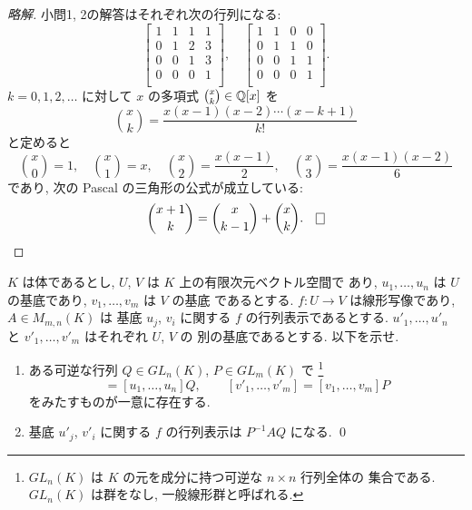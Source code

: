 \documentclass[12pt,twoside]{jarticle}
\newcommand\commentout[1]{#1}
\newcommand\commentout[1]{}
\begin{document}
\commentout{
\begin{proof}[略解]
 小問1, 2の解答はそれぞれ次の行列になる:
 \begin{equation*}
  \begin{bmatrix}
   1 & 1 & 1 & 1 \\
   0 & 1 & 2 & 3 \\
   0 & 0 & 1 & 3 \\
   0 & 0 & 0 & 1 \\
  \end{bmatrix},
  \quad
  \begin{bmatrix}
   1 & 1 & 0 & 0 \\
   0 & 1 & 1 & 0 \\
   0 & 0 & 1 & 1 \\
   0 & 0 & 0 & 1 \\
  \end{bmatrix}.
 \end{equation*}
 $k=0,1,2,\ldots$ に対して $x$ の多項式 $\binom{x}{k}\in{\mathbb Q}[x]$ を
 \begin{equation*}
  \binom{x}{k} = \frac{x(x-1)(x-2)\cdots(x-k+1)}{k!}
 \end{equation*}
 と定めると
 \begin{equation*}
  \binom{x}{0}=1, \quad
  \binom{x}{1}=x, \quad
  \binom{x}{2}=\frac{x(x-1)}{2}, \quad
  \binom{x}{3}=\frac{x(x-1)(x-2)}{6}
 \end{equation*}
 であり, 次の Pascal の三角形の公式が成立している:
 \begin{equation*}
  \binom{x+1}{k}=\binom{x}{k-1}+\binom{x}{k}.
 \qed
 \end{equation*}
\end{proof}
}


\begin{question}[基底の変換, 5点]
  \label{q:P^{-1}AQ}
  $K$ は体であるとし, $U$, $V$ は $K$ 上の有限次元ベクトル空間で
  あり, $u_1,\ldots,u_n$ は $U$ の基底であり, $v_1,\ldots,v_m$ は $V$ の基底
  であるとする.  $f:U\to V$ は線形写像であり, $A\in M_{m,n}(K)$ は
  基底 $u_j$, $v_i$ に関する $f$ の行列表示であるとする.
  $u'_1,\ldots,u'_n$ と $v'_1,\ldots,v'_m$ はそれぞれ $U$, $V$ の
  別の基底であるとする.  以下を示せ.
  \begin{enumerate}
  \item ある可逆な行列 $Q\in GL_n(K)$, $P\in GL_m(K)$ で%
    \footnote{$GL_n(K)$ は $K$ の元を成分に持つ可逆な $n\times n$ 行列全体の
      集合である.  $GL_n(K)$ は群をなし, 一般線形群と呼ばれる.}
    \begin{equation*}
      [u'_1,\ldots,u'_n]=[u_1,\ldots,u_n]Q,
      \qquad
      [v'_1,\ldots,v'_m] = [v_1,\ldots,v_m]P
    \end{equation*}
    をみたすものが一意に存在する.
  \item 基底 $u'_j$, $v'_i$ に関する $f$ の行列表示は $P^{-1}AQ$ になる.
    \qed
  \end{enumerate}
\end{question}
\end{document}
